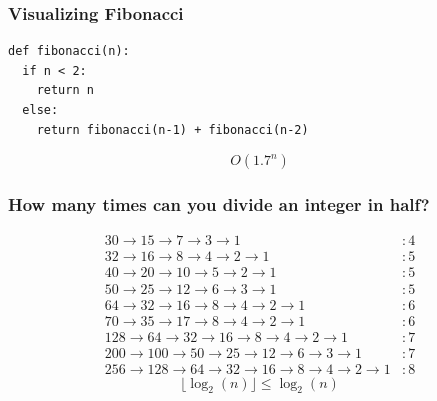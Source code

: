 \documentclass{beamer}
\newcommand{\bfr}[1]{\begin{frame}[fragile]\frametitle{{ #1 }}}
\begin{document}
\bfr{Visualizing Fibonacci}

\begin{lstlisting}
def fibonacci(n):
  if n < 2:
    return n
  else:
    return fibonacci(n-1) + fibonacci(n-2)
\end{lstlisting}
\[O(1.7^n)\]
\end{frame}

\bfr{How many times can you divide an integer in half?}

\begin{align*}
30 \rightarrow 15 \rightarrow 7 \rightarrow 3\rightarrow 1 &: 4
\\
32 \rightarrow 16 \rightarrow 8 \rightarrow 4
\rightarrow 2 \rightarrow 1 &:5
\\
40 \rightarrow 20 \rightarrow 10 \rightarrow 5
\rightarrow 2 \rightarrow 1 &:5
\\
50 \rightarrow 25 \rightarrow 12 \rightarrow 6
\rightarrow 3 \rightarrow 1 &:5
\\
64 \rightarrow 32 \rightarrow 16 \rightarrow 8 \rightarrow 4
\rightarrow 2 \rightarrow 1 &:6
\\
70 \rightarrow 35 \rightarrow 17 \rightarrow 8 \rightarrow 4
\rightarrow 2 \rightarrow 1 &:6\\
128\rightarrow 64 \rightarrow 32 \rightarrow 16 \rightarrow 8 \rightarrow 4
\rightarrow 2 \rightarrow 1 &:7\\
200\rightarrow 100 \rightarrow 50 \rightarrow 25 \rightarrow 12 \rightarrow 6
\rightarrow 3 \rightarrow 1 &:7\\
256\rightarrow 128\rightarrow 64 \rightarrow 32 \rightarrow 16 \rightarrow 8 \rightarrow 4
\rightarrow 2 \rightarrow 1 &:8
\end{align*}
\pause
\[
\lfloor\log_2(n)\rfloor \leq \log_2(n)
\]
\end{frame}
\end{document}
